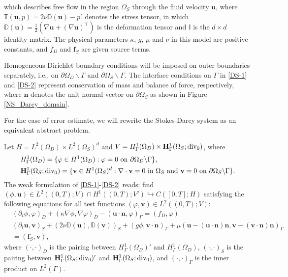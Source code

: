 \documentclass[a4paper, oneside]{book}
\def\u{{\mathbf{u}}}
\def\v{{\mathbf{v}}}
\def\bfu{{\mathbf{u}}}
\def\bfv{{\mathbf{v}}}
\def\bfn{{\mathbf{n}}}
\def\T{\mathbb{T}}
\def\D{{\mathbb D}}
\begin{document}
which describes free flow in the region $\Omega_S$ through the fluid velocity $\bfu$, where $\T(\u, p)=2\nu \mathbb{D}(\u)-p \mathbb{I}$ denotes the stress tensor, in which $\mathbb{D}(\u)=\frac12(\nabla\u+(\nabla \u)^\top)$ is the deformation tensor and $\mathbb{I}$ is the $d\times d$ identity matrix. The physical parameters $\kappa$, $g$, $\mu$ and $\nu$ in this model are positive constants, and $f_D$ and $\mathbf{f}_S$ are given source terms.

Homogeneous Dirichlet boundary conditions will be imposed on 
outer boundaries separately, i.e., on 
$\partial\Omega_D\backslash\Gamma$ and 
$\partial\Omega_S\backslash\Gamma$. 
The interface conditions on $\Gamma$ in \eqref{DS-1} 
and \eqref{DS-2} represent conservation of mass and 
balance of force, respectively, where $\bfn$ denotes the 
unit normal vector on $\partial\Omega_S$ as shown in Figure 
\ref{NS_Darcy_domain}.

For the ease of error estimate, we will rewrite the Stokes-Darcy system as an equivalent abstract problem.

Let $H= L^2(\Omega_D)\times L^2(\Omega_S)^d$ and $V=H^1_\Gamma(\Omega_D)\times {\bf H}^1_\Gamma(\Omega_S; {\rm div_0})$, where
\begin{align*}
&H^1_\Gamma(\Omega_D)=\{\varphi\in H^1(\Omega_D):\varphi=0\,\,\mbox{on}\,\,\partial\Omega_D\backslash\Gamma\},\\
&{\bf H}^1_\Gamma(\Omega_S; {\rm div_0})=\{{\v}\in H^1(\Omega_S)^d:
\nabla\cdot{\v}=0\,\,\mbox{in}\,\,\Omega_S\,\,\mbox{and}\,\,{\v}=0\,\,\mbox{on}\,\,\partial\Omega_S\backslash\Gamma\}.
\end{align*}
The weak formulation of \eqref{DS-1}-\eqref{DS-2} reads: find $(\phi,\u)\in L^2((0,T);V)\cap H^1((0,T);V') \hookrightarrow C([0,T];H) $
satisfying the following equations for all test functions $(\varphi,{\v})\in L^2((0,T);V)$:
\begin{align}
&(\partial_t\phi,\varphi)_{D}+(\kappa\nabla \phi,\nabla \varphi)_{D}
-(\bfu\cdot\bfn,\varphi)_{\Gamma}=(f_D,\varphi) \label{DS-weak-1} \\[5pt]
&(\partial_t\bfu,{\bfv})_{S}+(2\nu \D(\bfu),\D({\bfv}))_{S}
+(g\phi,{\bfv}\cdot\bfn)_{\Gamma}
+\mu(\bfu-(\bfu\cdot\bfn) \bfn,{\bfv}-({\bfv}\cdot\bfn) \bfn)_{\Gamma} \label{DS-weak-2} \\
&=(\mathbf{f}_S,{\bfv}) \nonumber ,
\end{align}
where $(\cdot,\cdot)_D$ is the pairing between $H^1_\Gamma(\Omega_D)'$ and $H^1_\Gamma(\Omega_D)$, $(\cdot,\cdot)_S$ is the pairing between ${\bf H}^1_\Gamma(\Omega_S; {\rm div_0})'$ and ${\bf H}^1_\Gamma(\Omega_S; {\rm div_0})$, and
$(\cdot,\cdot)_\Gamma$ is the inner product on $L^2(\Gamma)$.
\end{document}
